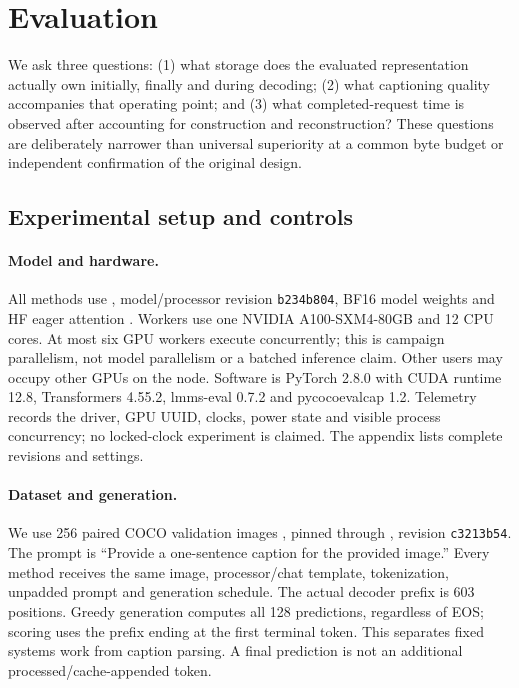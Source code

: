 \section{Evaluation}
\label{sec:evaluation}
We ask three questions: (1) what storage does the evaluated representation
actually own initially, finally and during decoding; (2) what captioning
quality accompanies that operating point; and (3) what completed-request
time is observed after accounting for construction and reconstruction?
These questions are deliberately narrower than universal superiority at
a common byte budget or independent confirmation of the original design.

\subsection{Experimental setup and controls}
\label{sec:setup}
\paragraph{Model and hardware.}
All methods use , model/processor revision
\texttt{b234b804}, BF16 model weights and HF eager attention
\citep{liu2024improved}. Workers use one NVIDIA A100-SXM4-80GB and 12 CPU
cores. At most six GPU workers execute concurrently; this is campaign
parallelism, not model parallelism or a batched inference claim. Other
users may occupy other GPUs on the node. Software is PyTorch 2.8.0 with
CUDA runtime 12.8, Transformers 4.55.2, lmms-eval 0.7.2 and
pycocoevalcap 1.2. Telemetry records the driver, GPU UUID, clocks, power
state and visible process concurrency; no locked-clock experiment is
claimed. The appendix lists complete revisions and settings.

\paragraph{Dataset and generation.}
We use 256 paired COCO validation images \citep{lin2014coco}, pinned through
, revision \texttt{c3213b54}.
The prompt is ``Provide a one-sentence caption for the provided image.''
Every method receives the same image, processor/chat template,
tokenization, unpadded prompt and generation schedule. The actual decoder
prefix is 603 positions. Greedy generation computes all 128 predictions,
regardless of EOS; scoring uses the prefix ending at the first terminal
token. This separates fixed systems work from caption parsing. A final
prediction is not an additional processed/cache-appended token.

